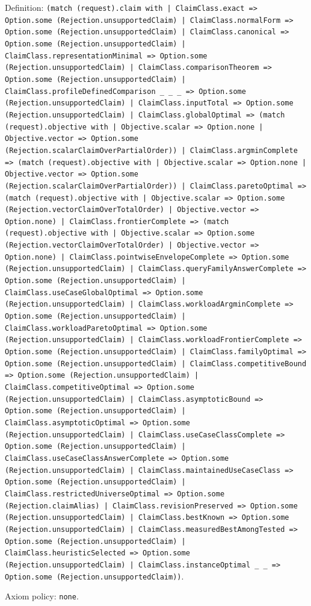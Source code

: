 \documentclass[11pt]{article}
\begin{document}
\noindent Definition: \texttt{(match (request).claim with | ClaimClass.exact => Option.some (Rejection.unsupportedClaim) | ClaimClass.normalForm => Option.some (Rejection.unsupportedClaim) | ClaimClass.canonical => Option.some (Rejection.unsupportedClaim) | ClaimClass.representationMinimal => Option.some (Rejection.unsupportedClaim) | ClaimClass.comparisonTheorem => Option.some (Rejection.unsupportedClaim) | ClaimClass.profileDefinedComparison \_ \_ \_ => Option.some (Rejection.unsupportedClaim) | ClaimClass.inputTotal => Option.some (Rejection.unsupportedClaim) | ClaimClass.globalOptimal => (match (request).objective with | Objective.scalar => Option.none | Objective.vector => Option.some (Rejection.scalarClaimOverPartialOrder)) | ClaimClass.argminComplete => (match (request).objective with | Objective.scalar => Option.none | Objective.vector => Option.some (Rejection.scalarClaimOverPartialOrder)) | ClaimClass.paretoOptimal => (match (request).objective with | Objective.scalar => Option.some (Rejection.vectorClaimOverTotalOrder) | Objective.vector => Option.none) | ClaimClass.frontierComplete => (match (request).objective with | Objective.scalar => Option.some (Rejection.vectorClaimOverTotalOrder) | Objective.vector => Option.none) | ClaimClass.pointwiseEnvelopeComplete => Option.some (Rejection.unsupportedClaim) | ClaimClass.queryFamilyAnswerComplete => Option.some (Rejection.unsupportedClaim) | ClaimClass.useCaseGlobalOptimal => Option.some (Rejection.unsupportedClaim) | ClaimClass.workloadArgminComplete => Option.some (Rejection.unsupportedClaim) | ClaimClass.workloadParetoOptimal => Option.some (Rejection.unsupportedClaim) | ClaimClass.workloadFrontierComplete => Option.some (Rejection.unsupportedClaim) | ClaimClass.familyOptimal => Option.some (Rejection.unsupportedClaim) | ClaimClass.competitiveBound => Option.some (Rejection.unsupportedClaim) | ClaimClass.competitiveOptimal => Option.some (Rejection.unsupportedClaim) | ClaimClass.asymptoticBound => Option.some (Rejection.unsupportedClaim) | ClaimClass.asymptoticOptimal => Option.some (Rejection.unsupportedClaim) | ClaimClass.useCaseClassComplete => Option.some (Rejection.unsupportedClaim) | ClaimClass.useCaseClassAnswerComplete => Option.some (Rejection.unsupportedClaim) | ClaimClass.maintainedUseCaseClass => Option.some (Rejection.unsupportedClaim) | ClaimClass.restrictedUniverseOptimal => Option.some (Rejection.claimAlias) | ClaimClass.revisionPreserved => Option.some (Rejection.unsupportedClaim) | ClaimClass.bestKnown => Option.some (Rejection.unsupportedClaim) | ClaimClass.measuredBestAmongTested => Option.some (Rejection.unsupportedClaim) | ClaimClass.heuristicSelected => Option.some (Rejection.unsupportedClaim) | ClaimClass.instanceOptimal \_ \_ => Option.some (Rejection.unsupportedClaim))}.\par
\noindent Axiom policy: \texttt{none}.\par
\end{document}
